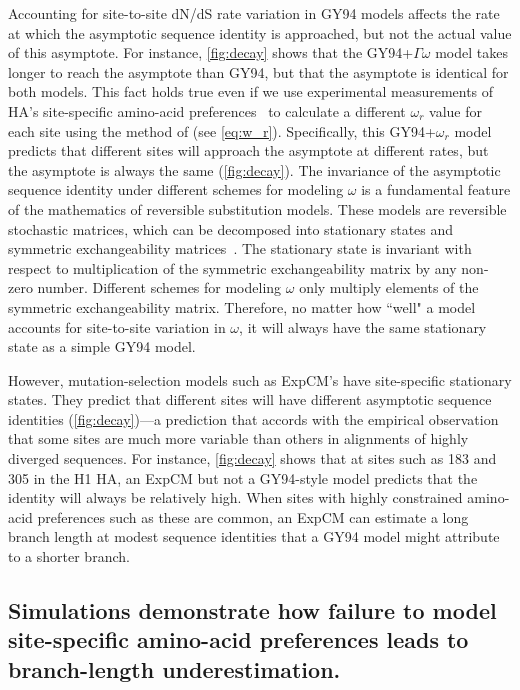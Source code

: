 \documentclass[11pt]{article}
\begin{document}
Accounting for site-to-site dN/dS rate variation in GY94 models affects the rate at which the asymptotic sequence identity is approached, but not the actual value of this asymptote. 
For instance, \ref{fig:decay} shows that the GY94+$\Gamma\omega$ model takes longer to reach the asymptote than GY94, but that the asymptote is identical for both models. 
This fact holds true even if we use experimental measurements of HA's site-specific amino-acid preferences~\citep{doud2016accurate} to calculate a different $\omega_r$ value for each site using the method of \citet{spielman2015relationship} (see \ref{eq:w_r}).
Specifically, this GY94+$\omega_r$ model predicts that different sites will approach the asymptote at different rates, but the asymptote is always the same (\ref{fig:decay}).
The invariance of the asymptotic sequence identity under different schemes for modeling $\omega$ is a fundamental feature of the mathematics of reversible substitution models.
These models are reversible stochastic matrices, which can be decomposed into stationary states and symmetric exchangeability matrices~\citep{nielsen2006statistical}.
The stationary state is invariant with respect to multiplication of the symmetric exchangeability matrix by any non-zero number.
Different schemes for modeling $\omega$ only multiply elements of the symmetric exchangeability matrix.
Therefore, no matter how ``well" a model accounts for site-to-site variation in $\omega$, it will always have the same stationary state as a simple GY94 model. 

However, mutation-selection models such as ExpCM's have site-specific stationary states.
They predict that different sites will have different asymptotic sequence identities (\ref{fig:decay})---a prediction that accords with the empirical observation that some sites are much more variable than others in alignments of highly diverged sequences.
For instance, \ref{fig:decay} shows that at sites such as 183 and 305 in the H1 HA, an ExpCM but not a GY94-style model predicts that the identity will always be relatively high. 
When sites with highly constrained amino-acid preferences such as these are common, an ExpCM can estimate a long branch length at modest sequence identities that a GY94 model might attribute to a shorter branch.


\subsection*{Simulations demonstrate how failure to model site-specific amino-acid preferences leads to branch-length underestimation.}
\end{document}
